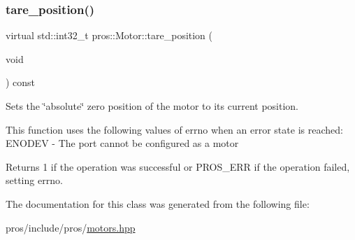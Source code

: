 \subsubsection{\texorpdfstring{tare\+\_\+position()}{tare\_position()}}
{\footnotesize\ttfamily virtual std\+::int32\+\_\+t pros\+::\+Motor\+::tare\+\_\+position (\begin{DoxyParamCaption}\item[{void}]{ }\end{DoxyParamCaption}) const\hspace{0.3cm}{\ttfamily [virtual]}}

Sets the \char`\"{}absolute\char`\"{} zero position of the motor to its current position.

This function uses the following values of errno when an error state is reached\+: E\+N\+O\+D\+EV -\/ The port cannot be configured as a motor

\begin{DoxyReturn}{Returns}
1 if the operation was successful or P\+R\+O\+S\+\_\+\+E\+RR if the operation failed, setting errno. 
\end{DoxyReturn}


The documentation for this class was generated from the following file\+:\begin{DoxyCompactItemize}
\item 
pros/include/pros/\hyperlink{motors_8hpp}{motors.\+hpp}\end{DoxyCompactItemize}
